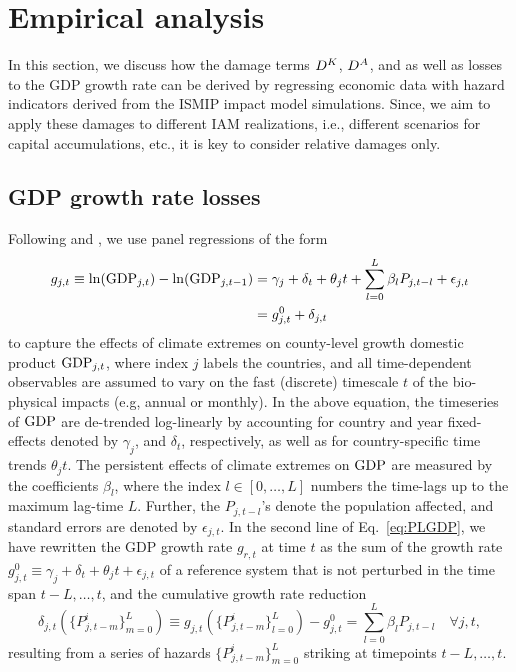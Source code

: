 \documentclass[preprint,3p,authoryear]{elsarticle}
\begin{document}
\section{Empirical analysis}
\label{sec:empAna}
In this section, we discuss how the damage terms $D^K$, $D^A$, and as well as losses to the GDP growth rate can be derived by regressing economic data with hazard indicators derived from the ISMIP impact model simulations. Since, we aim to apply these damages to different IAM realizations, i.e., different scenarios for capital accumulations, etc., it is key to consider relative damages only.

\subsection{GDP growth rate losses}
\label{subsec:g}
Following \citet{BAK19} and \citet{HSI14}, we use panel regressions of the form
\begin{subequations}
\label{eq:PLGDP}
\begin{align}
  g_{j,t}\equiv \ln(\operatorname{GDP}_{j,t})-\ln(\operatorname{GDP}_{j,t-1}) &= \gamma_j + \delta_{t} + \theta_j t + \sum_{l=0}^{L}\beta_{l}P_{j,t-l}+\epsilon_{j,t}\notag\\
  &= g^{0}_{j,t}+\delta_{j,t}
\end{align}
\end{subequations}
to capture the effects of climate extremes on county-level growth domestic product $\operatorname{GDP}_{j,t}$, where index $j$ labels the countries, and all time-dependent observables are assumed to vary on the fast (discrete) timescale $t$ of the bio-physical impacts (e.g, annual or monthly).
In the above equation, the timeseries of $\operatorname{GDP}$ are de-trended log-linearly by accounting for country and year fixed-effects denoted by $\gamma_j$, and $\delta_t$, respectively, as well as for country-specific time trends $\theta_j t$. The persistent effects of climate extremes on $\operatorname{GDP}$ are measured by the coefficients $\beta_l$, where the index $l\in[0,\ldots,L]$ numbers the time-lags up to the maximum lag-time $L$. Further, the $P_{j,t-l}$'s denote the population affected, and standard errors are denoted by $\epsilon_{j,t}$. In the second line of Eq.~\eqref{eq:PLGDP}, we have rewritten the GDP growth rate $g_{r,t}$ at time $t$ as the sum of the growth rate $g_{j,t}^0\equiv\gamma_j+\delta_t+\theta_j t+\epsilon_{j,t}$ of a reference system that is not perturbed in the time span $t-L,\ldots,t$, and the cumulative growth rate reduction 
\begin{equation}
  \label{eq:delta}
  \delta_{j,t}\left(\lbrace P_{j,t-m}^i\rbrace_{m=0}^L\right)\equiv g_{j,t}\left(\lbrace P_{j,t-m}^i\rbrace_{l=0}^L\right)-g_{j,t}^0= \sum_{l=0}^L\beta_lP_{j,t-l}\quad\forall j,t,
\end{equation}
resulting from a series of hazards $\lbrace P_{j,t-m}^i\rbrace_{m=0}^L$ striking at timepoints  $t-L,\ldots,t$.
\end{document}
